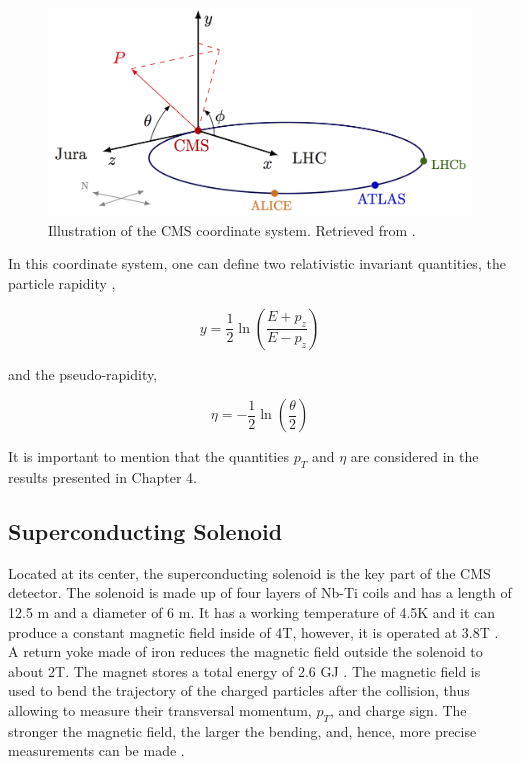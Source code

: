 \begin{figure}[htp!]
	\centering
	\includegraphics{MainContent/Figs/cms_coordinate_system.png}
	\caption{Illustration of the CMS coordinate system. Retrieved from \cite{bonanomi2021response}.}
	\label{fig:cms_coordinate_system}
\end{figure}

In this coordinate system, one can define two relativistic invariant quantities, the particle rapidity \cite{bonanomi2021response},

\begin{equation}
y = \frac{1}{2}\ln\left(\frac{E+p_z}{E-p_z}\right)
\end{equation}

and the pseudo-rapidity,

\begin{equation}
\eta = -\frac{1}{2}\ln\left(\frac{\theta}{2}\right)
\end{equation}

It is important to mention that the quantities $p_T$ and $\eta$ are considered in the results presented in Chapter 4.

\subsection{Superconducting Solenoid}
Located at its center, the superconducting solenoid is the key part of the CMS detector. The solenoid is made up of four layers of Nb-Ti coils and has a length of 12.5 m and a diameter of 6 m. It has a working temperature of 4.5K and it can produce a constant magnetic field inside of 4T, however, it is operated at 3.8T \cite{bragagnolo2021measurement, baron2018desarrollo}. A return yoke made of iron reduces the magnetic field outside the solenoid to about 2T. The magnet stores a total energy of 2.6 GJ \cite{fedi2016studies}. The magnetic field is used to bend the trajectory of the charged particles after the collision, thus allowing to measure their transversal momentum, $p_T$, and charge sign. The stronger the magnetic field, the larger the bending, and, hence, more precise measurements can be made \cite{sanchez2020search, presilla2021lepton}.

